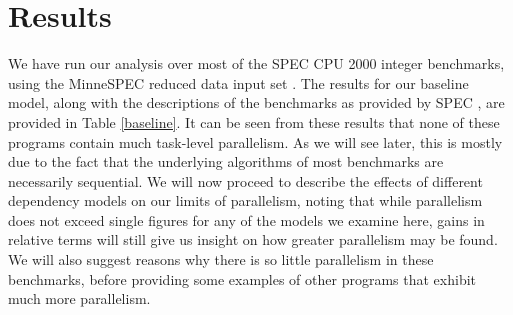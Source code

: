 \section{Results}

We have run our analysis over most of the SPEC CPU 2000 integer benchmarks, using the MinneSPEC reduced data input set \cite{KleinOsowski02minnespec}.
The results for our baseline model, along with the descriptions of the benchmarks as provided by SPEC \cite{henning00spec}, are provided in Table \ref{baseline}.
It can be seen from these results that none of these programs contain much task-level parallelism.
As we will see later, this is mostly due to the fact that the underlying algorithms of most benchmarks are necessarily sequential.
We will now proceed to describe the effects of different dependency models on our limits of parallelism, noting that while parallelism does not exceed single figures for any of the models we examine here, gains in relative terms will still give us insight on how greater parallelism may be found.
We will also suggest reasons why there is so little parallelism in these benchmarks, before providing some examples of other programs that exhibit much more parallelism.

